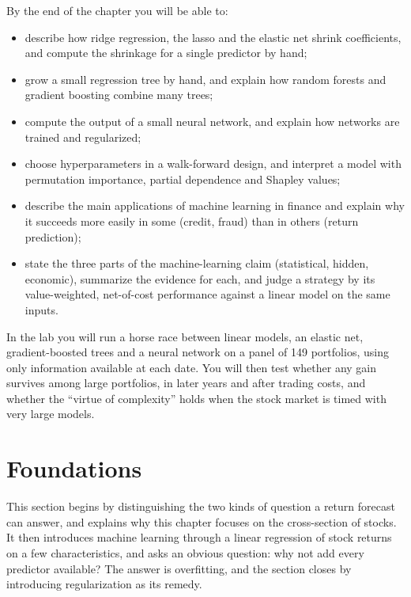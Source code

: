 By the end of the chapter you will be able to:

\begin{itemize}
  \item describe how ridge regression, the lasso and the elastic net shrink coefficients, and compute the shrinkage for a single predictor by hand;
  \item grow a small regression tree by hand, and explain how random forests and gradient boosting combine many trees;
  \item compute the output of a small neural network, and explain how networks are trained and regularized;
  \item choose hyperparameters in a walk-forward design, and interpret a model with permutation importance, partial dependence and Shapley values;
  \item describe the main applications of machine learning in finance and explain why it succeeds more easily in some (credit, fraud) than in others (return prediction);
  \item state the three parts of the machine-learning claim (statistical, hidden, economic), summarize the evidence for each, and judge a strategy by its value-weighted, net-of-cost performance against a linear model on the same inputs.
\end{itemize}

In the lab you will run a horse race between linear models, an elastic net, gradient-boosted trees and a neural network on a panel of 149 portfolios, using only information available at each date. You will then test whether any gain survives among large portfolios, in later years and after trading costs, and whether the ``virtue of complexity'' holds when the stock market is timed with very large models.

\section{Foundations}
\label{sec:21-foundations}

This section begins by distinguishing the two kinds of question a return forecast can answer, and explains why this chapter focuses on the cross-section of stocks. It then introduces machine learning through a linear regression of stock returns on a few characteristics, and asks an obvious question: why not add every predictor available? The answer is overfitting, and the section closes by introducing regularization as its remedy.


